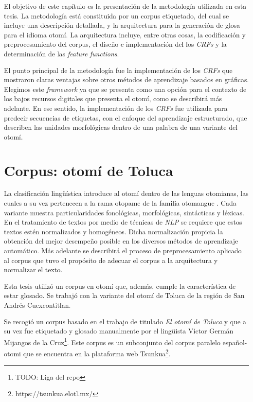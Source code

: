 \documentclass[letterpaper,12pt,oneside]{book}
\theoremstyle{definition}
\begin{document}
El objetivo de este capítulo es la presentación de la metodología utilizada en esta tesis. La metodología está constituida por un corpus etiquetado, del cual se incluye una descripción detallada, y la arquitectura para la generación de glosa para el idioma otomí. La arquitectura incluye, entre otras cosas, la codificación y preprocesamiento del corpus, el diseño e implementación del los \textit{CRFs} y la determinación de las \textit{feature functions}.

El punto principal de la metodología fue la implementación de los \textit{CRFs} que mostraron claras ventajas sobre otros métodos de aprendizaje basados en gráficas. Elegimos este \textit{framework} ya que se presenta como una opción para el contexto de los bajos recursos digitales que presenta el otomí, como se describirá más adelante. En ese sentido, la implementación de los \textit{CRFs} fue utilizada para predecir secuencias de etiquetas, con el enfoque del aprendizaje estructurado, que describen las unidades morfológicas dentro de una palabra de una variante del otomí. 

\section{Corpus: otomí de Toluca}

La clasificación lingüística introduce al otomí dentro de las lenguas otomianas, las cuales a su vez pertenecen a la rama otopame de la familia otomangue \citep{barrientos2004otomies}. Cada variante muestra particularidades fonológicas, morfológicas, sintácticas y léxicas. En el tratamiento de textos por medio de técnicas de \textit{NLP} se requiere que estos textos estén normalizados y homogéneos. Dicha normalización propicia la obtención del mejor desempeño posible en los diversos métodos de aprendizaje automático. Más adelante se describirá el proceso de preprocesamiento aplicado al corpus que tuvo el propósito de adecuar el corpus a la arquitectura y normalizar el texto.

Esta  tesis utilizó un corpus en otomí que, además, cumple la característica de estar glosado. Se trabajó con la variante del otomí de Toluca de la región de San Andrés Cuexcontitlan.

Se recogió un corpus basado en el trabajo de \citet{lastra1992otomi} titulado \emph{El otomí de Toluca} y que a su vez fue etiquetado y glosado manualmente por el lingüista Víctor Germán Mijangos de la Cruz\footnote{TODO: Liga del repo}. Este corpus es un subconjunto del corpus paralelo español-otomi que se encuentra en la plataforma web Tsunkua\footnote{https://tsunkua.elotl.mx/}.
\end{document}
